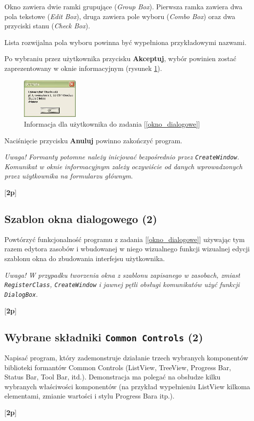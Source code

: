       Okno zawiera dwie ramki grupujące ({\em Group Box}). Pierwsza ramka zawiera dwa pola tekstowe
      ({\em Edit Box}), druga zawiera pole wyboru ({\em Combo Box}) oraz dwa przyciski stanu ({\em Check Box}).

      Lista rozwijalna pola wyboru powinna być wypełniona przykładowymi nazwami.

      Po wybraniu przez użytkownika przycisku {\bf Akceptuj}, wybór powinien zostać zaprezentowany w oknie
      informacyjnym (rysunek \ref{r2}).

      	\begin{figure}
	\begin{center}
	\includegraphics[width=0.25\textwidth]{z1_02}
	\end{center}
	\caption{Informacja dla użytkownika do zadania [\ref{okno_dialogowe}]}
	\label{r2}
	\end{figure}

      Naciśnięcie przycisku {\bf Anuluj} powinno zakończyć program.
      
      {\em Uwaga! Formanty potomne należy inicjować bezpośrednio przez {\tt CreateWindow}. Komunikat w oknie informacyjnym zależy oczywiście od
      danych wprowadzonych przez użytkownika na formularzu głównym}.
      
      [{\bf 2p}]

\subsection{Szablon okna dialogowego (2)} 
      
      Powtórzyć funkcjonalność programu z zadania [\ref{okno_dialogowe}] używając tym razem 
\label{szablon_okna}	  
	  edytora zasobów i wbudowanej w niego wizualnego funkcji wizualnej edycji szablonu okna do zbudowania interfejsu użytkownika. 
	  
      {\em Uwaga! W przypadku tworzenia okna z szablonu zapisanego w zasobach, zmiast {\tt RegisterClass}, {\tt CreateWindow} i jawnej pętli obsługi komunikatów użyć funkcji {\tt DialogBox}}.

      [{\bf 2p}]

\subsection{Wybrane składniki {\tt Common Controls} (2)}

      Napisać program, który zademonstruje działanie trzech wybranych komponentów biblioteki formantów Common Controls
\label{common_controls}	  
      (ListView, TreeView, Progress Bar, Status Bar, Tool Bar, itd.). Demonstracja ma polegać
      na obsłudze kilku wybranych właściwości komponentów (na przykład wypełnieniu ListView kilkoma
      elementami, zmianie wartości i stylu Progress Bara itp.). 
      
      [{\bf 2p}]
            

